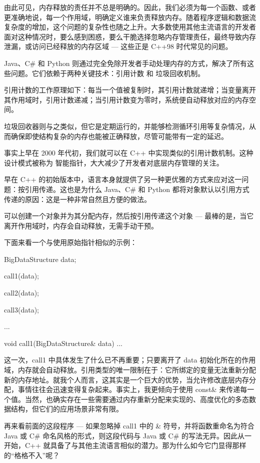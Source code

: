 由此可见，内存释放的责任并不总是明确的。因此，我们必须为每一个函数、或者更准确地说，每一个作用域，明确定义谁来负责释放内存。随着程序逻辑和数据流复杂度的增加，这个问题的复杂性也随之上升。大多数使用其他主流语言的开发者面对这种情况时，要么感到困惑，要么干脆选择忽略内存管理责任，最终导致内存泄漏，或访问已经释放的内存区域 --- 这些正是 C++98 时代常见的问题。

Java、C\# 和 Python 则通过完全免除开发者手动处理内存的方式，解决了所有这些问题。它们依赖于两种关键技术：引用计数 和 垃圾回收机制。

引用计数的工作原理如下：每当一个值被复制时，其引用计数就递增；当变量离开其作用域时，引用计数递减；当引用计数变为零时，系统便自动释放对应的内存空间。

垃圾回收器则与之类似，但它是定期运行的，并能够检测循环引用等复杂情况，从而确保即使结构复杂的内存也能被正确释放，尽管可能带有一定的延迟。

事实上早在 2000 年代初，我们就可以在 C++ 中实现类似的引用计数机制。这种设计模式被称为 智能指针，大大减少了开发者对底层内存管理的关注。

早在 C++ 的初始版本中，语言本身就提供了另一种更优雅的方式来应对这一问题：按引用传递。这也是为什么 Java、C\# 和 Python 都将对象默认以引用方式传递的原因：这是一种非常自然且方便的做法。

可以创建一个对象并为其分配内存，然后按引用传递这个对象 --- 最棒的是，当它离开作用域时，内存会自动释放，无需手动干预。

下面来看一个与使用原始指针相似的示例：

\begin{cpp}
BigDataStructure data{};

call1(data);

call2(data);

call3(data);

...

void call1(BigDataStructure& data){
  ...
}
\end{cpp}

这一次，call1 中具体发生了什么已不再重要；只要离开了 data 初始化所在的作用域，内存就会自动释放。引用类型的唯一限制在于：它所绑定的变量无法重新分配新的内存地址。就我个人而言，这其实是一个巨大的优势，当允许修改底层内存分配，事情往往会迅速变得复杂起来。事实上，我更倾向于使用 const\& 来传递每一个值。当然，也确实存在一些需要通过内存重新分配来实现的、高度优化的多态数据结构，但它们的应用场景非常有限。

再来看前面的这段程序 --- 如果忽略掉 call1 中的 \& 符号，并将函数重命名为符合 Java 或 C\# 命名风格的形式，则这段代码与 Java 或 C\# 的写法无异。因此从一开始，C++ 就具备了与其他主流语言相似的潜力。那为什么如今它门显得那样的“格格不入”呢？

